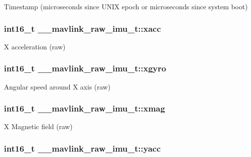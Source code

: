 Timestamp (microseconds since U\+N\+I\+X epoch or microseconds since system boot) 

\hypertarget{struct____mavlink__raw__imu__t_ade9a866890ed99f81ce8bd7dbef2c920}{
\subsubsection[{xacc}]{\setlength{\rightskip}{0pt plus 5cm}int16\+\_\+t \+\_\+\+\_\+mavlink\+\_\+raw\+\_\+imu\+\_\+t\+::xacc}}\label{struct____mavlink__raw__imu__t_ade9a866890ed99f81ce8bd7dbef2c920}


X acceleration (raw) 

\hypertarget{struct____mavlink__raw__imu__t_ad1b8a0589cf0a476cb04629dcb60bbe9}{
\subsubsection[{xgyro}]{\setlength{\rightskip}{0pt plus 5cm}int16\+\_\+t \+\_\+\+\_\+mavlink\+\_\+raw\+\_\+imu\+\_\+t\+::xgyro}}\label{struct____mavlink__raw__imu__t_ad1b8a0589cf0a476cb04629dcb60bbe9}


Angular speed around X axis (raw) 

\hypertarget{struct____mavlink__raw__imu__t_a4aa7dda8a63c114e2b60e5d9f767b9ba}{
\subsubsection[{xmag}]{\setlength{\rightskip}{0pt plus 5cm}int16\+\_\+t \+\_\+\+\_\+mavlink\+\_\+raw\+\_\+imu\+\_\+t\+::xmag}}\label{struct____mavlink__raw__imu__t_a4aa7dda8a63c114e2b60e5d9f767b9ba}


X Magnetic field (raw) 

\hypertarget{struct____mavlink__raw__imu__t_a5080c838e03f9ed2237fffbfd26ff1a3}{
\subsubsection[{yacc}]{\setlength{\rightskip}{0pt plus 5cm}int16\+\_\+t \+\_\+\+\_\+mavlink\+\_\+raw\+\_\+imu\+\_\+t\+::yacc}}\label{struct____mavlink__raw__imu__t_a5080c838e03f9ed2237fffbfd26ff1a3}


